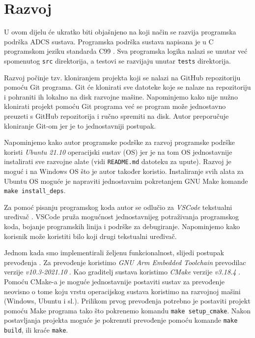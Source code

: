 \documentclass[times, utf8, diplomski, numeric]{templates/template}
\begin{document}
{    \section{Razvoj}{
        U ovom dijelu će ukratko biti objašnjeno na koji način se razvija programska podrška ADCS sustava. Programska podrška sustava napisana je u C programskom jeziku standarda C99 \cite{c99}. Sva programska logika nalazi se unutar već spomenutog \texttt{src} direktorija, a testovi se razvijaju unutar \texttt{tests} direktorija. 

        Razvoj počinje tzv. kloniranjem projekta koji se nalazi na GitHub repozitoriju \cite{github_repo} pomoću Git programa. Git će klonirati sve datoteke koje se nalaze na repozitoriju i pohraniti ih lokalno na disk razvojne mašine. Napominjemo kako nije nužno klonirati projekt pomoću Git programa već se program može jednostavno preuzeti s GitHub repozitorija i ručno spremiti na disk. Autor preporučuje kloniranje Git-om jer je to jednostavniji postupak.
        
        Napominjemo kako autor programske podrške za razvoj programske podrške koristi \emph{Ubuntu 21.10} operacijski sustav (OS) jer je na tom OS jednostavnije instalirati sve razvojne alate (vidi \texttt{README.md} datoteku za upute). Razvoj je moguć i na Windows OS što je autor također koristio. Instaliranje svih alata za Ubuntu OS moguće je napraviti jednostavnim pokretanjem GNU Make komande \texttt{make install\_deps}.

        Za pomoć pisanju programskog koda autor se odlučio za \emph{VSCode} tekstualni uređivač \cite{vscode}. VSCode pruža mogućnost jednostavnijeg potraživanja programskog koda, bojanje programskih linija i podrške za debugiranje. Napominjemo kako korisnik može koristiti bilo koji drugi tekstualni uređivač.

        Jednom kada smo implementirali željenu funkcionalnost, slijedi postupak prevođenja . Za prevođenje koristimo \emph{GNU Arm Embedded Toolchain} prevodilac verzije \emph{v10.3-2021.10} \cite{gnu_arm_toolchain}. Kao graditelj sustava  koristimo \emph{CMake} verzije \emph{v3.18.4} \cite{cmake}. Pomoću CMake-a je moguće jednostavnije postaviti sustav za prevođenje neovisno o tome koju vrstu operacijskog sustava koristimo na razvojnoj mašini (Windows, Ubuntu i sl.). Prilikom prvog prevođenja potrebno je postaviti projekt pomoću Make programa tako što pokrenemo komandu \texttt{make setup\_cmake}. Nakon postavljanja projekta moguće je pokrenuti prevođenje pomoću komande \texttt{make build}, ili kraće \texttt{make}. 

}}
\end{document}
